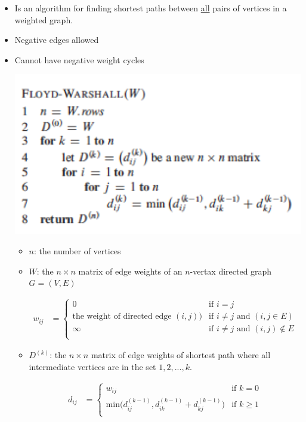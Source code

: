 \documentclass[12pt]{article}
\begin{document}
\begin{enumerate}[1.]
\begin{itemize}
        \begin{itemize}
            \item Is an algorithm for finding shortest paths between \underline{all} pairs of vertices in a weighted graph.
            \item Negative edges allowed
            \item Cannot have negative weight cycles

            \begin{center}
            \includegraphics[width=0.5\linewidth]{images/worksheet_4_solution_46.png}
            \end{center}

            \begin{itemize}
                \item $n$: the number of vertices
                \item $W$: the $n \times n$ matrix of edge weights of an $n$-vertax directed graph $G = (V,E)$

                \begin{align}
                    w_{ij} &= \begin{cases}
                        0 & \text{if $i = j$}\\
                        \text{the weight of directed edge $(i,j)$)} & \text{if $i \neq j$ and $(i,j \in E)$}\\
                        \infty & \text{if $i \neq j$ and $(i,j) \notin E$}\\
                    \end{cases}
                \end{align}

                \item $D^{(k)}$: the $n \times n$ matrix of edge weights of shortest path
                where all intermediate vertices are in the set ${1,2,...,k}$.

                \begin{align}
                    d_{ij} &= \begin{cases}
                        w_{ij} & \text{if $k = 0$}\\
                        \text{min($d_{ij}^{(k-1)}, d_{ik}^{(k-1)} + d_{kj}^{(k-1)}$)} & \text{if $k \geq 1$}\\
                    \end{cases}
                \end{align}
            \end{itemize}


\end{itemize}
\end{itemize}
\end{enumerate}
\end{document}
